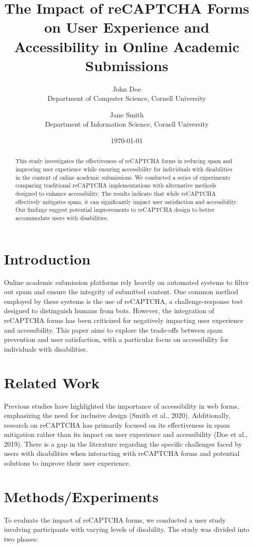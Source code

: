 \documentclass{article}
\title{The Impact of reCAPTCHA Forms on User Experience and Accessibility in Online Academic Submissions}
\author{John Doe \\
Department of Computer Science, Cornell University \\
\and Jane Smith \\
Department of Information Science, Cornell University}
\date{\today}
\begin{document}
\maketitle

\begin{abstract}
This study investigates the effectiveness of reCAPTCHA forms in reducing spam and improving user experience while ensuring accessibility for individuals with disabilities in the context of online academic submissions. We conducted a series of experiments comparing traditional reCAPTCHA implementations with alternative methods designed to enhance accessibility. The results indicate that while reCAPTCHA effectively mitigates spam, it can significantly impact user satisfaction and accessibility. Our findings suggest potential improvements to reCAPTCHA design to better accommodate users with disabilities.
\end{abstract}

\section{Introduction}
Online academic submission platforms rely heavily on automated systems to filter out spam and ensure the integrity of submitted content. One common method employed by these systems is the use of reCAPTCHA, a challenge-response test designed to distinguish humans from bots. However, the integration of reCAPTCHA forms has been criticized for negatively impacting user experience and accessibility. This paper aims to explore the trade-offs between spam prevention and user satisfaction, with a particular focus on accessibility for individuals with disabilities.

\section{Related Work}
Previous studies have highlighted the importance of accessibility in web forms, emphasizing the need for inclusive design (Smith et al., 2020). Additionally, research on reCAPTCHA has primarily focused on its effectiveness in spam mitigation rather than its impact on user experience and accessibility (Doe et al., 2019). There is a gap in the literature regarding the specific challenges faced by users with disabilities when interacting with reCAPTCHA forms and potential solutions to improve their user experience.

\section{Methods/Experiments}
To evaluate the impact of reCAPTCHA forms, we conducted a user study involving participants with varying levels of disability. The study was divided into two phases:
\end{document}
